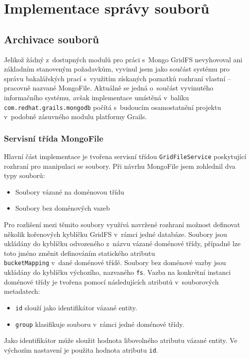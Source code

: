 \chapter{Implementace správy souborů}

\section{Archivace souborů}
Jelikož žádný z~dostupných modulů pro práci s~Mongo GridFS nevyhovoval ani základním stanoveným požadavkům, vyvinul jsem jako součást systému pro správu bakalářských prací s~využitím získaných poznatků rozhraní vlastní -- pracovně nazvané MongoFile. Aktuálně se jedná o~součást vyvinutého informačního systému, avšak implementace umístěná v~balíku \texttt{com.redhat.grails.mongodb} počítá s~budoucím osamostatnění projektu v~podobně zásuvného modulu platformy Grails.

\subsection{Servisní třída MongoFile}
Hlavní část implementace je tvořena servisní třídou \texttt{GridFileService} poskytující rozhraní pro manipulaci se soubory. Při návrhu MongoFile jsem zohlednil dva typy souborů:
\begin{itemize}
\item Soubory vázané na doménovou třídu
\item Soubory bez doménových vazeb
\end{itemize}
Pro rozlišení mezi těmito soubory využívá navržené rozhraní možnost definovat několik kořenových kyblíčku GridFS v~rámci jedné databáze. Soubory jsou ukládány do kyblíčku odvozeného z~názvu vázané doménové třídy, případně lze toto jméno změnit definováním statického atributu
\\\texttt{bucketMapping} v~dané doménové třídě. Soubory bez doménové vazby jsou ukládány do kyblíčku výchozího, nazvaného \texttt{fs}. Vazba na konkrétní instanci doménové třídy je tvořena pomocí následujících atributů v~souborových metadatech:
\begin{itemize}
\item \texttt{id} slouží jako identifikátor vázané entity.
\item \texttt{group} klasifikuje souboru v~rámci jedné doménové třídy.
\end{itemize}
Jako identifikátor může sloužit hodnota libovolného atributu vázané entity. Ve výchozím nastavení je použita hodnota atributu \texttt{id}.

